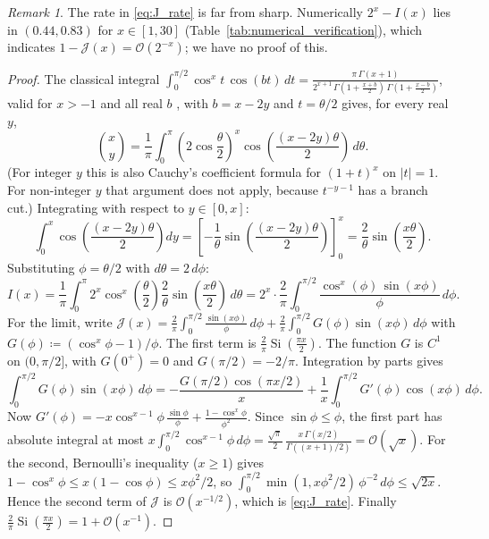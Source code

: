 \documentclass[11pt,a4paper]{article}
\theoremstyle{plain}
\theoremstyle{definition}
\theoremstyle{remark}
\newtheorem{remark}[theorem]{Remark}
\numberwithin{equation}{section}
\begin{document}
\begin{remark}
The rate in \eqref{eq:J_rate} is far from sharp. Numerically $2^x - I(x)$ lies in $(0.44, 0.83)$ for $x \in [1, 30]$ (Table~\ref{tab:numerical_verification}), which indicates $1 - \mathcal{J}(x) = \mathcal{O}(2^{-x})$; we have no proof of this.
\end{remark}

\begin{proof}
The classical integral $\int_0^{\pi/2} \cos^{x} t\, \cos(bt)\,dt = \frac{\pi\,\Gamma(x+1)}{2^{x+1}\,\Gamma(1 + \frac{x+b}{2})\,\Gamma(1 + \frac{x-b}{2})}$, valid for $x > -1$ and all real $b$ \cite[3.631.9]{gradshteyn2015}, with $b = x - 2y$ and $t = \theta/2$ gives, for every real $y$,
\begin{equation}
\binom{x}{y} = \frac{1}{\pi}\int_0^\pi \left(2\cos\frac{\theta}{2}\right)^x \cos\left(\frac{(x-2y)\theta}{2}\right)\,d\theta.
\end{equation}
(For integer $y$ this is also Cauchy's coefficient formula for $(1+t)^x$ on $|t| = 1$. For non-integer $y$ that argument does not apply, because $t^{-y-1}$ has a branch cut.)
Integrating with respect to $y \in [0, x]$:
\begin{equation}
\int_0^x \cos\left(\frac{(x-2y)\theta}{2}\right)dy = \left[-\frac{1}{\theta}\sin\left(\frac{(x-2y)\theta}{2}\right)\right]_0^x = \frac{2}{\theta}\sin\left(\frac{x\theta}{2}\right).
\end{equation}
Substituting $\phi = \theta/2$ with $d\theta = 2\,d\phi$:
\begin{equation}
I(x) = \frac{1}{\pi}\int_0^\pi 2^x \cos^x\left(\frac{\theta}{2}\right) \frac{2}{\theta}\sin\left(\frac{x\theta}{2}\right)\,d\theta = 2^x \cdot \frac{2}{\pi}\int_0^{\pi/2} \frac{\cos^x(\phi)\,\sin(x\phi)}{\phi}\,d\phi.
\end{equation}
For the limit, write $\mathcal{J}(x) = \frac{2}{\pi}\int_0^{\pi/2}\frac{\sin(x\phi)}{\phi}\,d\phi + \frac{2}{\pi}\int_0^{\pi/2} G(\phi)\sin(x\phi)\,d\phi$ with $G(\phi) \coloneqq (\cos^x\phi - 1)/\phi$. The first term is $\frac{2}{\pi}\operatorname{Si}(\frac{\pi x}{2})$. The function $G$ is $C^1$ on $(0, \pi/2]$, with $G(0^+) = 0$ and $G(\pi/2) = -2/\pi$. Integration by parts gives
\[
\int_0^{\pi/2} G(\phi)\sin(x\phi)\,d\phi = -\frac{G(\pi/2)\cos(\pi x/2)}{x} + \frac{1}{x}\int_0^{\pi/2} G'(\phi)\cos(x\phi)\,d\phi .
\]
Now $G'(\phi) = -x\cos^{x-1}\phi\,\frac{\sin\phi}{\phi} + \frac{1-\cos^x\phi}{\phi^2}$. Since $\sin\phi \le \phi$, the first part has absolute integral at most $x\int_0^{\pi/2}\cos^{x-1}\phi\,d\phi = \frac{\sqrt{\pi}}{2}\,\frac{x\,\Gamma(x/2)}{\Gamma((x+1)/2)} = \mathcal{O}(\sqrt{x})$. For the second, Bernoulli's inequality ($x \ge 1$) gives $1 - \cos^x\phi \le x(1 - \cos\phi) \le x\phi^2/2$, so $\int_0^{\pi/2} \min(1, x\phi^2/2)\,\phi^{-2}\,d\phi \le \sqrt{2x}$. Hence the second term of $\mathcal{J}$ is $\mathcal{O}(x^{-1/2})$, which is \eqref{eq:J_rate}. Finally $\frac{2}{\pi}\operatorname{Si}(\frac{\pi x}{2}) = 1 + \mathcal{O}(x^{-1})$.
\end{proof}
\end{document}
